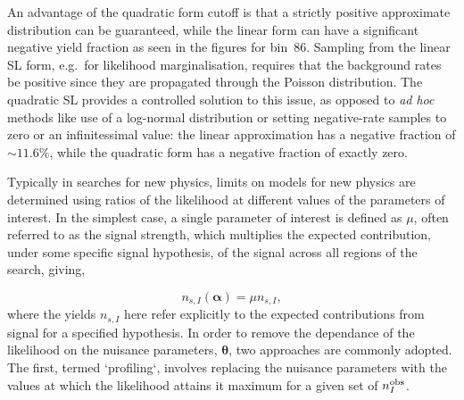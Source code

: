 \documentclass[11pt]{article}
\begin{document}

An advantage of the quadratic form cutoff is that a strictly positive
approximate distribution can be guaranteed, while the linear form can have a
significant negative yield fraction as seen in the figures for bin~86. Sampling
from the linear SL form, e.g.~for likelihood marginalisation, requires that the
background rates be positive since they are propagated through the Poisson
distribution. The quadratic SL provides a controlled solution to this issue,
as opposed to \emph{ad hoc} methods like use of a log-normal distribution or
setting negative-rate samples to zero or an infinitessimal value: the 
linear approximation has a negative fraction of $\sim\!11.6\%$, while the
quadratic form has a negative fraction of exactly zero.

Typically in searches for new physics, limits on models for new physics
are determined using ratios of the likelihood at different values of the parameters of interest.
In the simplest case, a single parameter of interest is defined as $\mu$, often referred to
as the signal strength, which multiplies the expected contribution, under some specific signal hypothesis,
of the signal across all regions of the search, giving,

\begin{equation}
 n_{s,I}(\bm{\alpha}) = \mu n_{s,I},
\label{eq:muscale}
\end{equation}
where the yields $n_{s,I}$ here refer explicitly to the expected contributions from signal for a specified hypothesis.
In order to remove the dependance of the likelihood on the nuisance parameters, $\bm{\theta}$, two approaches are
commonly adopted. The first, termed `profiling`, involves replacing the nuisance parameters with the values at which
the likelihood attains it maximum for a given set of $n^{\rm{obs}}_{I}$.
\end{document}

